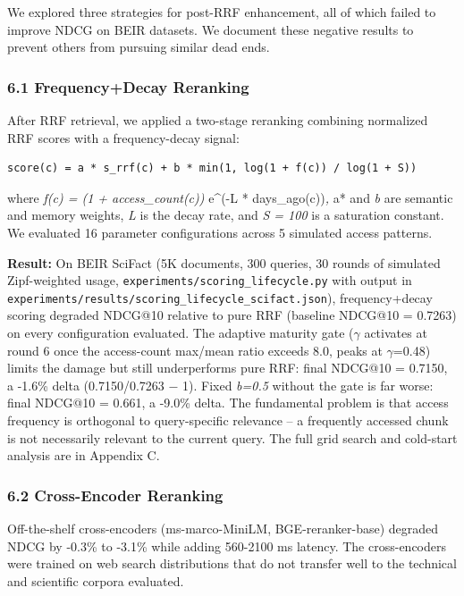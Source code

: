 \documentclass[
  11pt]{article}
\begin{document}
We explored three strategies for post-RRF enhancement, all of which failed to improve NDCG on BEIR datasets. We document these negative results to prevent others from pursuing similar dead ends.

\subsubsection{6.1 Frequency+Decay Reranking}\label{frequencydecay-reranking}

After RRF retrieval, we applied a two-stage reranking combining normalized RRF scores with a frequency-decay signal:

\begin{verbatim}
score(c) = a * s_rrf(c) + b * min(1, log(1 + f(c)) / log(1 + S))
\end{verbatim}

where \emph{f(c) = (1 + access\_count(c)) } e\^{}(-L * days\_ago(c))\emph{, }a* and \emph{b} are semantic and memory weights, \emph{L} is the decay rate, and \emph{S = 100} is a saturation constant. We evaluated 16 parameter configurations across 5 simulated access patterns.

\textbf{Result:} On BEIR SciFact (5K documents, 300 queries, 30 rounds of simulated Zipf-weighted usage, \texttt{experiments/scoring\_lifecycle.py} with output in \texttt{experiments/results/scoring\_lifecycle\_scifact.json}), frequency+decay scoring degraded NDCG@10 relative to pure RRF (baseline NDCG@10 = 0.7263) on every configuration evaluated. The adaptive maturity gate ($\gamma$ activates at round 6 once the access-count max/mean ratio exceeds 8.0, peaks at $\gamma$=0.48) limits the damage but still underperforms pure RRF: final NDCG@10 = 0.7150, a -1.6\% delta (0.7150/0.7263 $-$ 1). Fixed \emph{b=0.5} without the gate is far worse: final NDCG@10 = 0.661, a -9.0\% delta. The fundamental problem is that access frequency is orthogonal to query-specific relevance -- a frequently accessed chunk is not necessarily relevant to the current query. The full grid search and cold-start analysis are in Appendix C.

\subsubsection{6.2 Cross-Encoder Reranking}\label{cross-encoder-reranking}

Off-the-shelf cross-encoders (ms-marco-MiniLM, BGE-reranker-base) degraded NDCG by -0.3\% to -3.1\% while adding 560-2100 ms latency. The cross-encoders were trained on web search distributions that do not transfer well to the technical and scientific corpora evaluated.
\end{document}
